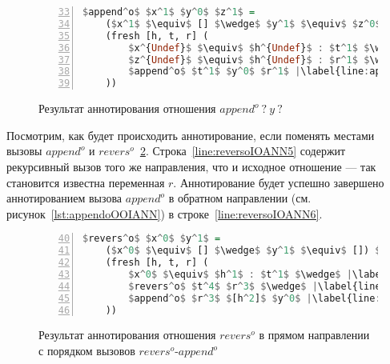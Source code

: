 \begin{figure}[h!]
  \begin{center}
  \begin{minipage}{0.5\textwidth}
  \begin{lstlisting}[language=Haskell, frame=single, numbers=left,numberstyle=\small, firstnumber=33, escapechar=|]
  $append^o$ $x^1$ $y^0$ $z^1$ =
    ($x^1$ $\equiv$ [] $\wedge$ $y^1$ $\equiv$ $z^0$) $\vee$ |\label{line:appendoOIOANN2}|
    (fresh [h, t, r] (
        $x^{Undef}$ $\equiv$ $h^{Undef}$ : $t^1$ $\wedge$ |\label{line:appendoOIOANNfail4}|
        $z^{Undef}$ $\equiv$ $h^{Undef}$ : $r^1$ $\wedge$ |\label{line:appendoOIOANNfail5}|
        $append^o$ $t^1$ $y^0$ $r^1$ |\label{line:appendoOIOANNfail6}|
    ))
    \end{lstlisting}
  \end{minipage}
  \end{center}
  \caption{Результат аннотирования отношения $append^o \ ? \ y \ ?$}
  \label{lst:appendoOIOANNfail}
\end{figure}

Посмотрим, как будет происходить аннотирование, если поменять местами вызовы $append^o$ и $revers^o$~\ref{lst:reversoIOANN}.
Строка~\ref{line:reversoIOANN5} содержит рекурсивный вызов того же направления, что и исходное отношение --- так становится известна переменная $r$.
Аннотирование будет успешно завершено аннотированием вызова $append^o$ в обратном направлении (см. рисунок~\ref{lst:appendoOOIANN}) в строке~\ref{line:reversoIOANN6}.

\begin{figure}[h!]
  \begin{center}
  \begin{minipage}{0.4\textwidth}
  \begin{lstlisting}[language=Haskell, frame=single, numbers=left,numberstyle=\small, firstnumber=40, escapechar=|]
  $revers^o$ $x^0$ $y^1$ =
    ($x^0$ $\equiv$ [] $\wedge$ $y^1$ $\equiv$ []) $\vee$ |\label{line:reversoIOANN2}|
    (fresh [h, t, r] (
        $x^0$ $\equiv$ $h^1$ : $t^1$ $\wedge$ |\label{line:reversoIOANN4}|
        $revers^o$ $t^4$ $r^3$ $\wedge$ |\label{line:reversoIOANN5}|
        $append^o$ $r^3$ $[h^2]$ $y^0$ |\label{line:reversoIOANN6}|
    ))
    \end{lstlisting}
  \end{minipage}
  \end{center}
  \caption{Результат аннотирования отношения $revers^o$ в прямом направлении с порядком вызовов $revers^o$-$append^o$}
  \label{lst:reversoIOANN}
\end{figure}

